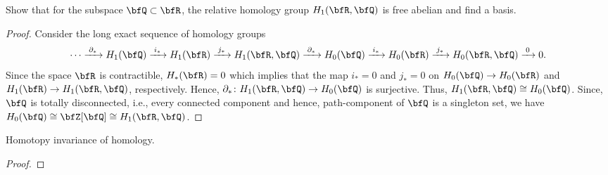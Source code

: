 \begin{problem}[Hatcher {\S}2.1, Ex.\,18]
Show that for the subspace $\bfQ\subset\bfR$, the relative homology group
$H_1(\bfR,\bfQ)$ is free abelian and find a basis.
\end{problem}
\begin{proof}
Consider the long exact sequence of homology groups
\begin{equation}
  \label{eq:relative-short-exact-sequence-3}
\cdots\xrightarrow{\;\partial_*\;}
H_1(\bfQ)\xrightarrow{\;i_*\;}
H_1(\bfR)\xrightarrow{\;j_*\;}
H_1(\bfR,\bfQ)\xrightarrow{\;\partial_*\;}
H_0(\bfQ)\xrightarrow{\;i_*\;}
H_0(\bfR)\xrightarrow{\;j_*\;}
H_0(\bfR,\bfQ)\xrightarrow{\;0\;}0.
\end{equation}
Since the space $\bfR$ is contractible, $H_*(\bfR)=0$ which implies that
the map $i_*=0$ and $j_*=0$ on $H_0(\bfQ)\to H_0(\bfR)$ and $H_1(\bfR)\to
H_1(\bfR,\bfQ)$, respectively. Hence, $\partial_*\colon H_1(\bfR,\bfQ)\to
H_0(\bfQ)$ is surjective. Thus, $H_1(\bfR,\bfQ)\cong H_0(\bfQ)$. Since,
$\bfQ$ is totally disconnected, i.e., every connected component and hence,
path-component of $\bfQ$ is a singleton set, we have
$H_0(\bfQ)\cong \bfZ[\bfQ]\cong H_1(\bfR,\bfQ)$.
\end{proof}

\newpage
\begin{problem}
Homotopy invariance of homology.
\end{problem}
\begin{proof}

\end{proof}

